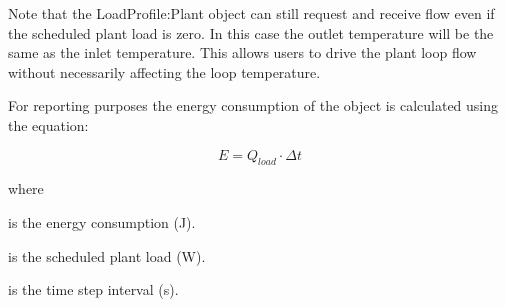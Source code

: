 Note that the LoadProfile:Plant object can still request and receive flow even if the scheduled plant load is zero. In this case the outlet temperature will be the same as the inlet temperature. This allows users to drive the plant loop flow without necessarily affecting the loop temperature.

For reporting purposes the energy consumption of the object is calculated using the equation:

\begin{equation}
E = Q_{load} \cdot \Delta t
\end{equation}

\noindent where
\begin{description}[labelwidth=1cm, leftmargin=!]
\item[$E$] is the energy consumption (\si{\J}).
\item[$Q_{load}$] is the scheduled plant load (\si{\W}).
\item[$\Delta t$] is the time step interval (\si{\s}).
\end{description}
